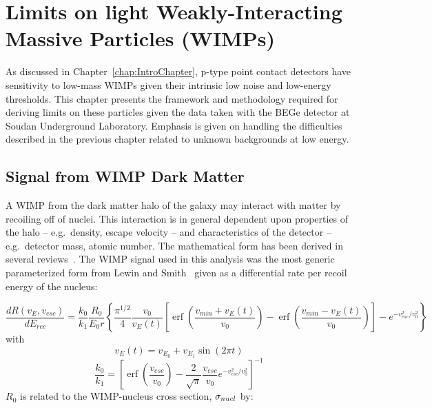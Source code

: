 

\chapter{Limits on light Weakly-Interacting Massive Particles (WIMPs)}
\label{chap:DMWIMPLimits}

	As discussed in Chapter~\ref{chap:IntroChapter}, p-type point contact detectors have sensitivity to low-mass WIMPs given their intrinsic low noise and low-energy thresholds.  This chapter presents the framework and methodology required for deriving limits on these particles given the data taken with the BEGe detector at Soudan Underground Laboratory.  Emphasis is given on handling the difficulties described in the previous chapter related to unknown backgrounds at low energy.  

	\section{Signal from WIMP Dark Matter}
	\label{sec:CalcLimitsOnWIMPSignal}	

	A WIMP from the dark matter halo of the galaxy may interact with matter by recoiling off of nuclei.  This interaction is in general dependent upon properties of the halo -- e.g.~density, escape velocity -- and characteristics of the detector -- e.g.~detector mass, atomic number.  The mathematical form has been derived in several reviews~\cite{Lew96,Jun96}.  The WIMP signal used in this analysis was the most generic parameterized form from Lewin and Smith~\cite{Lew96} given as a differential rate per recoil energy of the nucleus:

		\begin{equation}
			\frac{dR (v_{E}, v_{esc})}{dE_{rec}} = 
				\frac{k_{0}}{k_{1}} \frac{R_{0}}{E_{0} r} 
				\left\{ 
			 		\frac{\pi^{1/2}}{4} \frac{v_{0}}{v_{E}(t)} 
					\left[ 
						\operatorname{erf} \left( \frac{v_{min} + v_{E}(t)}{v_{0}} \right) - 
							   \operatorname{erf} \left( \frac{v_{min} - v_{E}(t)}{v_{0}} \right) 
					\right] 
					- e^{-v_{esc}^{2}/v_{0}^{2}} 
				\right\}
			\label{eqn:WIMPMasterEqn}
		\end{equation}
with 
		\[
		v_{E}(t) = v_{E_{0}} + v_{E_{1}}\sin (2 \pi t)
		\]
		\[
		\frac{k_{0}}{k_{1}} = \left[
			\operatorname{erf} \left( \frac{v_{esc}}{v_{0}} \right ) - 
			\frac{2}{\sqrt{\pi}} \frac{v_{esc}}{v_{0}} e^{-v_{esc}^{2}/v_{0}^{2}}
		\right]^{-1}
		\]
$R_{0}$ is related to the WIMP-nucleus cross section, $\sigma_{nucl}$ by:

